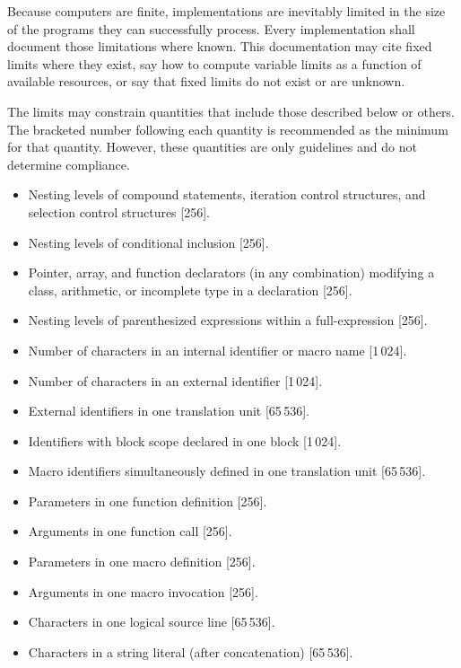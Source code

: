 
\begin{paras}

\pnum
Because computers are finite, \Cpp  implementations are inevitably
limited in the size of the programs they can successfully process.
Every implementation shall
document those limitations where known.
This documentation may cite fixed limits where they
exist, say how to compute variable limits as a function
of available resources, or say that fixed limits do not exist
or are unknown.

\pnum
The limits may constrain quantities
that include those described below or others.
The bracketed number following each quantity is recommended
as the minimum for that quantity.
However, these quantities are only guidelines and do not determine compliance.
\begin{itemize}
\item%
Nesting levels of compound statements,
iteration control structures,
and selection control structures [256].
\item%
Nesting levels of conditional inclusion [256].
\item%
Pointer, array, and function declarators
(in any combination)
modifying a class, arithmetic,
or incomplete type in a declaration [256].
\item%
Nesting levels of parenthesized expressions within a full-expression [256].
\item%
Number of
characters in an internal identifier
or macro name [1\,024].
\item%
Number of
characters in an external identifier [1\,024].
\item%
External identifiers in one translation unit [65\,536].
\item%
Identifiers with block scope declared in one block [1\,024].
\item%
Macro identifiers simultaneously defined in one
translation
unit [65\,536].
\item%
Parameters in one function definition [256].
\item%
Arguments in one function call [256].
\item%
Parameters in one macro definition [256].
\item%
Arguments in one macro invocation [256].
\item%
Characters in one logical source line [65\,536].
\item%
Characters in a string literal
(after concatenation) [65\,536].

\end{itemize}
\end{paras}
